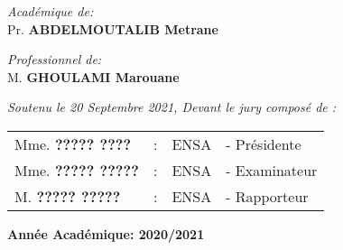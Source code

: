 \begin{titlepage}
\begin{minipage}{0.4\textwidth}
 \begin{flushleft}
 	\centering
    \emph{Académique de:} \\[0.5cm]
    Pr. \textbf{\textsc{ABDELMOUTALIB} Metrane}\\
 \end{flushleft}
\end{minipage}\hfill
\noindent
\begin{minipage}{0.4\textwidth}
 \begin{flushright}
 	\centering
    \emph{Professionnel de:} \\[0.5cm]
     M. \textbf{\textsc{GHOULAMI} Marouane}\\
  \end{flushright}
\end{minipage}
\vfill
\centering
{\large \textit{Soutenu le 20 Septembre 2021, Devant le jury composé de : }}\\[0.5cm]
\begin{tabular}{llll}
\large Mme. \textbf{????? \textsc{????}}     & : & \large ENSA & \large - Présidente \\[0.1cm]
\large Mme. \textbf{????? \textsc{?????}}    & : & \large ENSA & \large - Examinateur \\[0.1cm]
\large M. \textbf{????? \textsc{?????}}         & : & \large ENSA & \large - Rapporteur
\end{tabular}
\vfill
{\large \textbf{Année Académique: 2020/2021}}

\end{titlepage}
